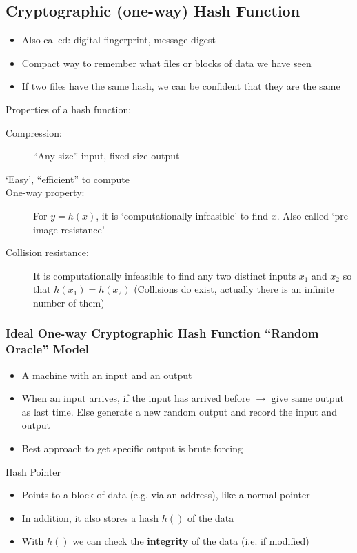 \subsection{Cryptographic (one-way) Hash Function}
\begin{itemize}
	\item Also called: digital fingerprint, message digest
	\item Compact way to remember what files or blocks of data we have seen
	\item If two files have the same hash, we can be confident that they are the same
\end{itemize}
Properties of a hash function:
\begin{description}
	\item[Compression:] ``Any size'' input, fixed size output
	\item[`Easy', ``efficient'' to compute]
	\item[One-way property:] For $y=h(x)$, it is `computationally infeasible' to find $x$. Also called `pre-image resistance'
	\item[Collision resistance:] It is computationally infeasible to find any two distinct inputs $x_1$ and $x_2$ so that $h(x_1)=h(x_2)$ (Collisions do exist, actually there is an infinite number of them)
\end{description}

\subsubsection{Ideal One-way Cryptographic Hash Function ``Random Oracle'' Model}
\begin{itemize}
	\item A machine with an input and an output
	\item When an input arrives, if the input has arrived before $\rightarrow$ give same output as last time. Else generate a new random output and record the input and output
	\item Best approach to get specific output is brute forcing
\end{itemize}

\begin{note}{Hash Pointer}
	\begin{itemize}
		\item Points to a block of data (e.g. via an address), like a normal pointer
		\item In addition, it also stores a hash $h()$ of the data
		\item With $h()$ we can check the \textbf{integrity} of the data (i.e. if modified)
	\end{itemize}
\end{note}